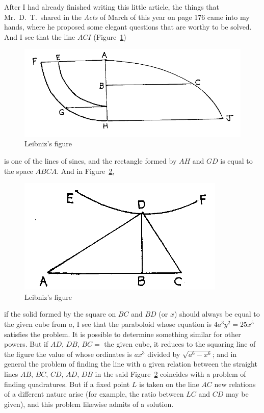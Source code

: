 \documentclass[twoside,openright]{article}
\begin{document}
After I had already finished writing this little article, the things
that Mr.\ D.\ T.\ shared in the {\em Acts} of March of this year on
page 176 came into my hands, where he proposed some elegant questions
that are worthy to be solved.
And I see that the line $ACI$ (Figure~\ref{Tschirn1})
\begin{figure}[p]
\begin{center}
\includegraphics[width=\textwidth]{fig/Figure54}
\caption{Leibniz's figure}
\label{Tschirn1}
\end{center}
\end{figure}  
is one of the lines of
sines, and the rectangle formed by $AH$ and $GD$ is equal to the space $ABCA$.  And in
Figure~\ref{Tschirn2},
 \begin{figure}[p]
\begin{center}
\includegraphics[width=.6\textwidth]{fig/Figure55}
\caption{Leibniz's figure}
\label{Tschirn2}
\end{center}
\end{figure} if the solid formed by the square on $BC$ and $BD$ (or
$x$) should always be equal to the given cube from $a$, I see that the
paraboloid whose equation is $4a^3 y^2 = 25x^5$ satisfies the problem.
It is possible to determine something similar for other powers.  But
if $AD$, $DB$, $BC =$ the given cube, it reduces to the squaring line
of the figure the value of whose ordinates is $ax^3$ divided by
$\sqrt{a^6- x^6}$; and in general the problem of finding the line with
a given relation between the straight lines $AB$, $BC$, $CD$, $AD$,
$DB$ in the said Figure~\ref{Tschirn2} coincides with a problem of
finding quadratures.  But if a fixed point $L$ is taken on the line
$AC$ new relations of a different nature arise (for example, the ratio
between $LC$ and $CD$ may be given), and this problem likewise admits
of a solution.
\end{document}
